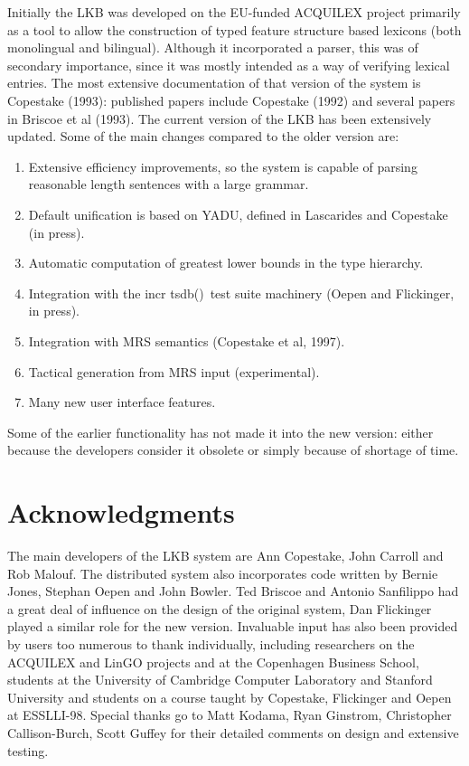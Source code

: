 \documentclass[12pt]{report}
\newcommand{\itsdb}{{\sf \lbrack incr tsdb()\rbrack}}
\begin{document}
Initially the LKB was developed on the 
EU-funded ACQUILEX project primarily as a
tool to allow the construction of typed feature structure based lexicons
(both monolingual and bilingual).  
Although it incorporated a parser,
this was of secondary importance, since it was mostly intended as
a way of verifying lexical entries.  The most extensive documentation
of that version of the system is Copestake (1993): published
papers include Copestake (1992) and several papers in Briscoe et al (1993).
The current version of the LKB has 
been extensively updated.  Some of the main changes compared to the older
version are:
\begin{enumerate}
\item Extensive efficiency improvements, so the system is capable
of parsing reasonable length sentences with a large grammar.
\item Default unification is based on YADU, defined in Lascarides and
Copestake (in press).
\item Automatic computation of greatest lower bounds in the type hierarchy.
\item Integration with the \itsdb\ test suite machinery 
(Oepen and Flickinger, in press).
\item Integration with MRS semantics (Copestake et al, 1997).
\item Tactical generation from MRS input (experimental). 
\item Many new user interface features.
\end{enumerate}
Some of the earlier functionality has not made it into the new version:
either because the developers consider it obsolete or simply because of
shortage of time.  

\section{Acknowledgments}
\label{ack}

The main developers of the LKB system 
are Ann Copestake, John Carroll
and Rob Malouf.  The distributed system also incorporates code
written by Bernie Jones, Stephan Oepen and   
John Bowler.  Ted Briscoe and Antonio Sanfilippo had a great 
deal of influence on the design of the original system,
Dan Flickinger played a similar role for the new version.
Invaluable input has also
been provided by users too numerous to thank individually, including
researchers on the ACQUILEX and LinGO projects and at
the Copenhagen Business School,
students
at the University of Cambridge Computer Laboratory and
Stanford University and students on a course taught by Copestake, Flickinger
and Oepen at ESSLLI-98.  Special thanks go to
Matt Kodama, Ryan Ginstrom, Christopher Callison-Burch, Scott Guffey
for their detailed comments on design and extensive testing.
\end{document}
